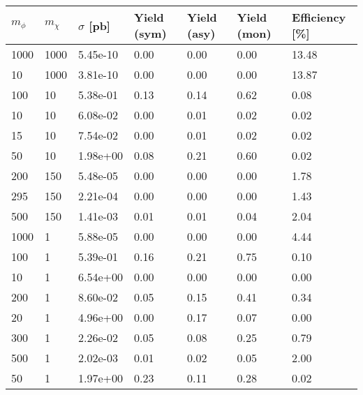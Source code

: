 \begin{table}
\small
\centering
\begin{tabular}{lllllll}
\hline
$m_\phi$ & $m_\chi$ & $\sigma$ [pb] & Yield (sym) & Yield (asy) & Yield (mon) & Efficiency [\%] \\ \hline
1000      &   1000      &   5.45e-10  &   0.00      &   0.00      &   0.00      &   13.48     \\ 
10        &   1000      &   3.81e-10  &   0.00      &   0.00      &   0.00      &   13.87     \\ 
100       &   10        &   5.38e-01  &   0.13      &   0.14      &   0.62      &   0.08      \\ 
10        &   10        &   6.08e-02  &   0.00      &   0.01      &   0.02      &   0.02      \\ 
15        &   10        &   7.54e-02  &   0.00      &   0.01      &   0.02      &   0.02      \\ 
50        &   10        &   1.98e+00  &   0.08      &   0.21      &   0.60      &   0.02      \\ 
200       &   150       &   5.48e-05  &   0.00      &   0.00      &   0.00      &   1.78      \\ 
295       &   150       &   2.21e-04  &   0.00      &   0.00      &   0.00      &   1.43      \\ 
500       &   150       &   1.41e-03  &   0.01      &   0.01      &   0.04      &   2.04      \\ 
1000      &   1         &   5.88e-05  &   0.00      &   0.00      &   0.00      &   4.44      \\ 
100       &   1         &   5.39e-01  &   0.16      &   0.21      &   0.75      &   0.10      \\ 
10        &   1         &   6.54e+00  &   0.00      &   0.00      &   0.00      &   0.00      \\ 
200       &   1         &   8.60e-02  &   0.05      &   0.15      &   0.41      &   0.34      \\ 
20        &   1         &   4.96e+00  &   0.00      &   0.17      &   0.07      &   0.00      \\ 
300       &   1         &   2.26e-02  &   0.05      &   0.08      &   0.25      &   0.79      \\ 
500       &   1         &   2.02e-03  &   0.01      &   0.02      &   0.05      &   2.00      \\ 
50        &   1         &   1.97e+00  &   0.23      &   0.11      &   0.28      &   0.02      \\ 

\end{tabular}
\end{table}
